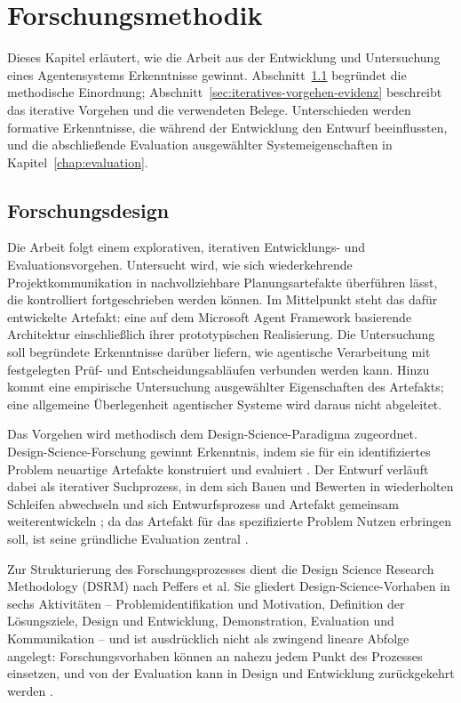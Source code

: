 \chapter{Forschungsmethodik}
\label{chap:forschungsmethodik}

Dieses Kapitel erläutert, wie die Arbeit aus der Entwicklung und
Untersuchung eines Agentensystems Erkenntnisse gewinnt.
Abschnitt~\ref{sec:forschungsdesign} begründet die methodische Einordnung;
Abschnitt~\ref{sec:iteratives-vorgehen-evidenz} beschreibt das iterative
Vorgehen und die verwendeten Belege. Unterschieden werden formative
Erkenntnisse, die während der Entwicklung den Entwurf beeinflussten,
und die abschließende Evaluation ausgewählter Systemeigenschaften in
Kapitel~\ref{chap:evaluation}.

\section{Forschungsdesign}
\label{sec:forschungsdesign}

Die Arbeit folgt einem explorativen, iterativen Entwicklungs- und
Evaluationsvorgehen. Untersucht wird, wie sich wiederkehrende
Projektkommunikation in nachvollziehbare Planungsartefakte überführen
lässt, die kontrolliert fortgeschrieben werden können. Im Mittelpunkt
steht das dafür entwickelte Artefakt: eine auf dem Microsoft Agent
Framework basierende Architektur einschließlich ihrer prototypischen
Realisierung. Die Untersuchung soll begründete Erkenntnisse darüber
liefern, wie agentische Verarbeitung mit festgelegten Prüf- und
Entscheidungsabläufen verbunden werden kann. Hinzu kommt eine empirische
Untersuchung ausgewählter Eigenschaften des Artefakts; eine allgemeine
Überlegenheit agentischer Systeme wird daraus nicht abgeleitet.

Das Vorgehen wird methodisch dem Design-Science-Paradigma zugeordnet.
Design-Science-Forschung gewinnt Erkenntnis, indem sie für ein identifiziertes
Problem neuartige Artefakte konstruiert und evaluiert
\cite[S.~75, 77]{hevner2004design}. Der Entwurf verläuft dabei als iterativer
Suchprozess, in dem sich Bauen und Bewerten in wiederholten Schleifen
abwechseln und sich Entwurfsprozess und Artefakt gemeinsam weiterentwickeln
\cite[S.~78--79]{hevner2004design}; da das Artefakt für das spezifizierte
Problem Nutzen erbringen soll, ist seine gründliche Evaluation zentral
\cite[S.~82]{hevner2004design}.

Zur Strukturierung des Forschungsprozesses
dient die Design Science Research Methodology (DSRM) nach Peffers et al. Sie
gliedert Design-Science-Vorhaben in sechs Aktivitäten -- Problemidentifikation
und Motivation, Definition der Lösungsziele, Design und Entwicklung,
Demonstration, Evaluation und Kommunikation
\cite[S.~46, 52--56]{peffers2007design} -- und ist ausdrücklich nicht als
zwingend lineare Abfolge angelegt: Forschungsvorhaben können an nahezu jedem
Punkt des Prozesses einsetzen, und von der Evaluation kann in Design und
Entwicklung zurückgekehrt werden \cite[S.~56]{peffers2007design}.

